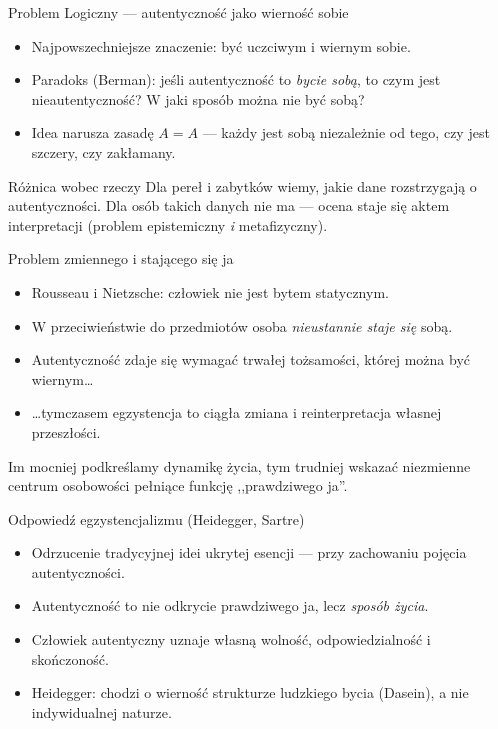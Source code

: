\documentclass{beamer}
\begin{document}
\begin{frame}{Problem Logiczny --- autentyczność jako wierność sobie}
  \begin{itemize}
    \item Najpowszechniejsze znaczenie: być uczciwym i wiernym sobie.
    \item Paradoks (Berman): jeśli autentyczność to \emph{bycie sobą}, to czym
          jest nieautentyczność? W jaki sposób można nie być sobą?
    \item Idea narusza zasadę \(A = A\) --- każdy jest sobą niezależnie od tego,
          czy jest szczery, czy zakłamany.
  \end{itemize}
  \vspace{0.5em}
  \begin{block}{Różnica wobec rzeczy}
    Dla pereł i zabytków wiemy, jakie dane rozstrzygają o autentyczności.
    Dla osób takich danych nie ma --- ocena staje się aktem interpretacji
    (problem epistemiczny \emph{i} metafizyczny).
  \end{block}
\end{frame}
 
\begin{frame}{Problem zmiennego i stającego się ja}
  \begin{itemize}
    \item Rousseau i Nietzsche: człowiek nie jest bytem statycznym.
    \item W przeciwieństwie do przedmiotów osoba \emph{nieustannie staje się} sobą.
    \item Autentyczność zdaje się wymagać trwałej tożsamości, której można
          być wiernym\ldots
    \item \ldots tymczasem egzystencja to ciągła zmiana i reinterpretacja
          własnej przeszłości.
  \end{itemize}
  \vspace{0.5em}
  Im mocniej podkreślamy dynamikę życia, tym trudniej wskazać niezmienne
  centrum osobowości pełniące funkcję ,,prawdziwego ja''.
\end{frame}
 
 
\begin{frame}{Odpowiedź egzystencjalizmu (Heidegger, Sartre)}
  \begin{itemize}
    \item Odrzucenie tradycyjnej idei ukrytej esencji --- przy zachowaniu
          pojęcia autentyczności.
    \item Autentyczność to nie odkrycie prawdziwego ja, lecz \emph{sposób życia}.
    \item Człowiek autentyczny uznaje własną wolność, odpowiedzialność
          i skończoność.
    \item Heidegger: chodzi o wierność strukturze ludzkiego bycia (Dasein),
          a nie indywidualnej naturze.
  \end{itemize}
\end{frame}
 
\end{document}
